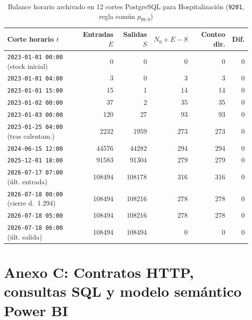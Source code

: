 \begin{table}[htbp]
\caption{Balance horario archivado en 12 cortes PostgreSQL para Hospitalización (\texttt{9201}, regla común $p_{99{,}9}$)}
\label{tab:anexo_cortes_n0}
{\singlespacing\footnotesize
\begin{tabularx}{\textwidth}{@{}Y r r r r r@{}}
\toprule
Corte horario $t$ & Entradas $E$ & Salidas $S$ & $N_0 + E - S$ & Conteo dir. & Dif. \\
\midrule
\texttt{2023-01-01 00:00} (stock inicial) & 0 & 0 & 0 & 0 & 0 \\
\texttt{2023-01-01 04:00} & 3 & 0 & 3 & 3 & 0 \\
\texttt{2023-01-01 15:00} & 15 & 1 & 14 & 14 & 0 \\
\texttt{2023-01-02 00:00} & 37 & 2 & 35 & 35 & 0 \\
\texttt{2023-01-03 00:00} & 120 & 27 & 93 & 93 & 0 \\
\texttt{2023-01-25 04:00} (tras calentam.) & \num{2232} & \num{1959} & 273 & 273 & 0 \\
\texttt{2024-06-15 12:00} & \num{44576} & \num{44282} & 294 & 294 & 0 \\
\texttt{2025-12-01 18:00} & \num{91583} & \num{91304} & 279 & 279 & 0 \\
\texttt{2026-07-17 07:00} (últ. entrada) & \num{108494} & \num{108178} & 316 & 316 & 0 \\
\texttt{2026-07-18 00:00} (cierre d.~1.294) & \num{108494} & \num{108216} & 278 & 278 & 0 \\
\texttt{2026-07-18 05:00} & \num{108494} & \num{108216} & 278 & 278 & 0 \\
\texttt{2026-07-18 06:00} (últ. salida) & \num{108494} & \num{108494} & 0 & 0 & 0 \\
\bottomrule
\end{tabularx}}
\end{table}

\clearpage
\section{Anexo C: Contratos HTTP, consultas SQL y modelo semántico Power BI}

